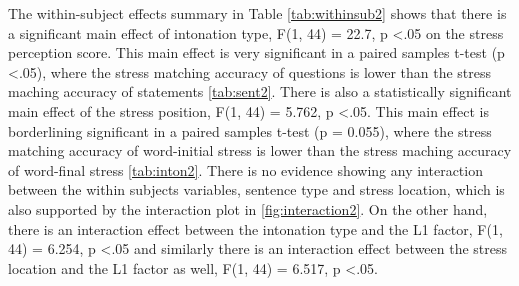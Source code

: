 \documentclass[a4paper]{article}
\begin{document}
The within-subject effects summary in Table \ref{tab:withinsub2} shows that there is a significant main effect of intonation type, F(1, 44) = 22.7, p \textless .05 on the stress perception score. This main effect is very significant in a paired samples t-test (p \textless .05), where the stress matching accuracy of questions is lower than the stress maching accuracy of statements \ref{tab:sent2}. There is also a statistically significant main effect of the stress position, F(1, 44) = 5.762, p \textless .05. This main effect is borderlining significant in a paired samples t-test (p = 0.055), where the stress matching accuracy of word-initial stress is lower than the stress maching accuracy of word-final stress \ref{tab:inton2}. There is no evidence showing any interaction between the within subjects variables, sentence type and stress location, which is also supported by the interaction plot in \ref{fig:interaction2}. On the other hand, there is an interaction effect between the intonation type and the L1 factor, F(1, 44) = 6.254, p \textless .05 and similarly there is an interaction effect between the stress location and the L1 factor as well,  F(1, 44) = 6.517, p \textless .05.
\end{document}
